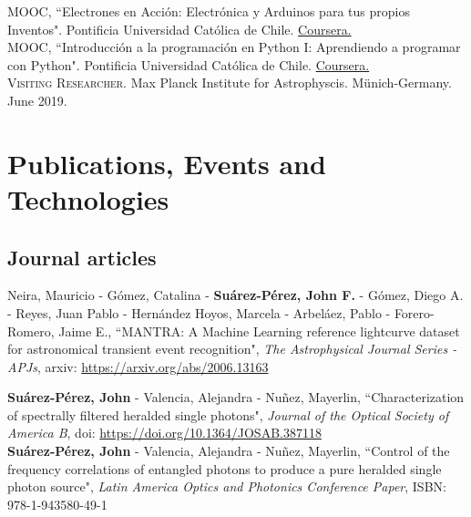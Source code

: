\documentclass[10pt, a4paper]{article}
\newcommand{\years}[1]{\marginnote{\scriptsize #1}}
\begin{document}
\years{2019}\textsc{MOOC}, “Electrones en Acción: Electrónica y Arduinos para tus propios Inventos". Pontificia Universidad Católica de Chile. \href{https://www.coursera.org/account/accomplishments/certificate/W5M5CZ3XE557}{Coursera.}\\

\years{2019}\textsc{MOOC}, “Introducción a la programación en Python I: Aprendiendo a programar con Python". Pontificia Universidad Católica de Chile. \href{https://www.coursera.org/account/accomplishments/certificate/8UEF5TUY6ACB}{Coursera.}\\

\years{2019}\textsc{Visiting Researcher}. Max Planck Institute for Astrophyscis. Münich-Germany. {June 2019}.\\


\section*{Publications, Events and Technologies}

\subsection*{Journal articles}
\noindent
\years{2020}Neira, Mauricio - Gómez, Catalina - \textbf{Suárez-Pérez, John F.} - Gómez, Diego A. - Reyes, Juan Pablo - Hernández Hoyos, Marcela - Arbeláez, Pablo - Forero-Romero, Jaime E., “MANTRA: A Machine Learning reference lightcurve dataset for astronomical transient event recognition", \emph{The Astrophysical Journal Series - APJs}, arxiv: \url{https://arxiv.org/abs/2006.13163} 
\\
\newpage

\years{2020}\textbf{Suárez-Pérez, John} - Valencia, Alejandra - Nuñez, Mayerlin, “Characterization of spectrally filtered heralded single photons", \emph{Journal of the Optical Society of America B}, doi: \url{https://doi.org/10.1364/JOSAB.387118}
\\

\years{2018}\textbf{Suárez-Pérez, John} - Valencia, Alejandra - Nuñez, Mayerlin, “Control of the frequency correlations of entangled photons to produce a pure heralded single photon source", \emph{Latin America Optics and Photonics Conference Paper}, ISBN: 978-1-943580-49-1 \\
\end{document}
